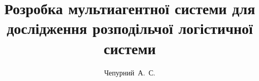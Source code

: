 \title{Розробка мультиагентної системи для дослідження розподільчої логістичної системи}
\author{Чепурний~А.~С.}